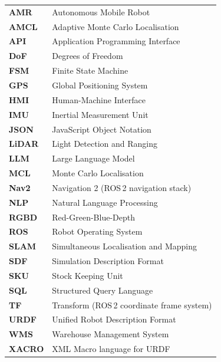 \documentclass[12pt,a4paper]{report}
\begin{document}
\begin{tabular}{ll}
\textbf{AMR}    & Autonomous Mobile Robot \\
\textbf{AMCL}   & Adaptive Monte Carlo Localisation \\
\textbf{API}    & Application Programming Interface \\
\textbf{DoF}    & Degrees of Freedom \\
\textbf{FSM}    & Finite State Machine \\
\textbf{GPS}    & Global Positioning System \\
\textbf{HMI}    & Human-Machine Interface \\
\textbf{IMU}    & Inertial Measurement Unit \\
\textbf{JSON}   & JavaScript Object Notation \\
\textbf{LiDAR}  & Light Detection and Ranging \\
\textbf{LLM}    & Large Language Model \\
\textbf{MCL}    & Monte Carlo Localisation \\
\textbf{Nav2}   & Navigation 2 (ROS\,2 navigation stack) \\
\textbf{NLP}    & Natural Language Processing \\
\textbf{RGBD}   & Red-Green-Blue-Depth \\
\textbf{ROS}    & Robot Operating System \\
\textbf{SLAM}   & Simultaneous Localisation and Mapping \\
\textbf{SDF}    & Simulation Description Format \\
\textbf{SKU}    & Stock Keeping Unit \\
\textbf{SQL}    & Structured Query Language \\
\textbf{TF}     & Transform (ROS\,2 coordinate frame system) \\
\textbf{URDF}   & Unified Robot Description Format \\
\textbf{WMS}    & Warehouse Management System \\
\textbf{XACRO}  & XML Macro language for URDF \\
\end{tabular}

\newpage

\setcounter{page}{1}

\end{document}
